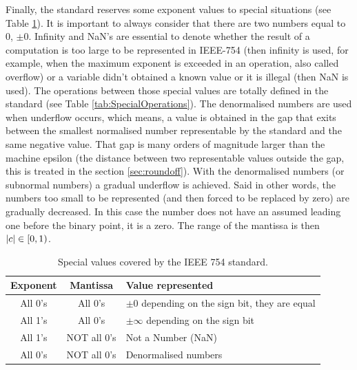 Finally, the standard reserves some exponent values to special situations (see Table \ref{tab:SpecialValues}). It is important to always consider that there are two numbers equal to $0$, $\pm 0$. Infinity and NaN's are essential to denote whether the result of a computation is too large to be represented in IEEE-754 (then infinity is used, for example, when the maximum exponent is exceeded in an operation, also called overflow) or a variable didn't obtained a known value or it is illegal (then NaN is used). The operations between those special values are totally defined in the standard (see Table \ref{tab:SpecialOperations}). The denormalised numbers are used when underflow occurs, which means, a value is obtained in the gap that exits between the smallest normalised number representable by the standard and the same negative value. That gap is many orders of magnitude larger than the machine epsilon (the distance between two representable values outside the gap, this is treated in the section \ref{sec:roundoff}). With the denormalised numbers (or subnormal numbers) a gradual underflow is achieved. Said in other words, the numbers too small to be represented (and then forced to be replaced by zero) are gradually decreased. In this case the number does not have an assumed leading one before the binary point, it is a zero. The range of the mantissa is then $\abs{c}\in\left[ 0,1\right)$.

\begin{table}
    \centering
    \begin{tabular}{| c | c | l |}
        \hline
        Exponent & Mantissa & Value represented \\ \hline
        All 0's  & All 0's & $\pm 0 $ depending on the sign bit, they are equal  \\ \hline
        All 1's  & All 0's & $\pm \infty$ depending on the sign bit \\ \hline
        All 1's & NOT all 0's & Not a Number (NaN)  \\ \hline
        All 0's  & NOT all 0's & Denormalised numbers  \\ \hline
    \end{tabular}
    \caption{Special values covered by the IEEE 754 standard.}
    \label{tab:SpecialValues}
\end{table}

